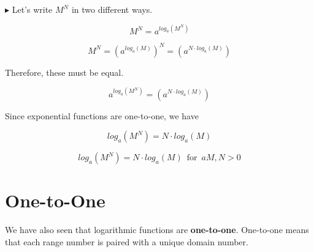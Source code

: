 \documentclass{ximera}
\begin{document}
$\blacktriangleright$  Let's write $M^N$ in two different ways.



\[   M^N = a^{log_a(M^N)}                  \]

\[   M^N = (a^{log_a(M)})^N =     (a^{N \cdot log_a(M)})             \]


Therefore, these must be equal.


\[    a^{log_a(M^N)}      =    (a^{N \cdot log_a(M)})                \]





Since exponential functions are one-to-one, we have 


\[    log_a(M^N)    =   N \cdot log_a(M)            \]








\begin{fact} 

\[    log_a(M^N)    =   N \cdot log_a(M)       \, \text{ for } \, a M, N  > 0        \]


\end{fact}

















\section{One-to-One}









We have also seen that logarithmic functions are \textbf{one-to-one}. One-to-one means that each range number is paired with a unique domain number.
\end{document}

